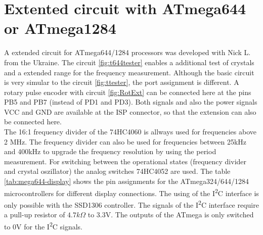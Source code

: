 \section{Extented circuit with ATmega644 or ATmega1284}

A extended circuit for ATmega644/1284 processors was developed with Nick L. from the Ukraine.
The circuit \ref{fig:t644tester} enables a additional test of crystals and a extended range
for the frequency measurement.
Although the basic circuit is very simular to the circuit \ref{fig:ttester}, the
port assignment is different.
A rotary pulse encoder with circuit \ref{fig:RotExt} can be connected here at the pins PB5 and PB7 (instead of PD1 and PD3).
Both signals and also the power signals VCC and GND are available at the ISP connector,
so that the extension can also be connected here.\\

The 16:1 frequency divider of the 74HC4060 is allways used for frequencies above 2 MHz.
The frequency divider can also be used for frequencies between 25kHz and 400kHz to
upgrade the frequency resolution by using the period measurement.
For switching between the operational states (frequency divider and crystal oszillator)
the analog switches 74HC4052 are used.
The table \ref{tab:mega644-display} shows the pin assignments for the ATmega324/644/1284
microcontrollers for different display connections.
The using of the I\textsuperscript{2}C interface is only possible with the SSD1306 controller.
The signals of the I\textsuperscript{2}C interface require a pull-up resistor of \(4.7k\Omega\) to 3.3V.
The outputs of the ATmega is only switched to 0V for the I\textsuperscript{2}C signals.


